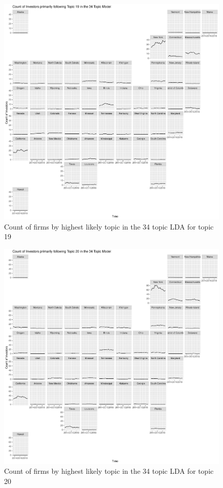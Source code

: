 		\begin{figure}
		\centering
		\includegraphics[width=1\linewidth]{Figures/ChapterV/USA_34_Topic19.pdf}
		\caption[Count of Firms for Topic 19 by Quarter]{Count of firms by highest likely topic in the 34 topic LDA for topic 19}
		\label{fig:StateLDA20}
	\end{figure}
	
		\begin{figure}
		\centering
		\includegraphics[width=1\linewidth]{Figures/ChapterV/USA_34_Topic20.pdf}
		\caption[Count of Firms for Topic 20 by Quarter]{Count of firms by highest likely topic in the 34 topic LDA for topic 20}
		\label{fig:StateLDA20}
	\end{figure}
	
